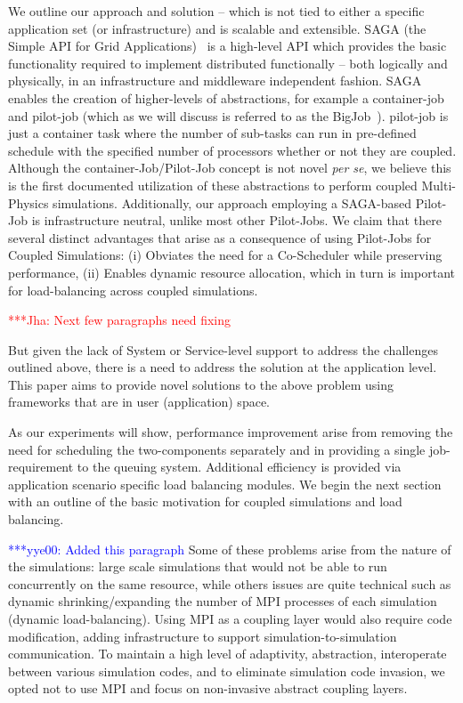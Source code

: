 \documentclass[conference,final]{IEEEtran}
\newcommand{\jhanote}[1]{ {\textcolor{red} { ***Jha: #1 }}}
\newcommand{\yyenote}[1]{ {\textcolor{blue} { ***yye00: #1 }}}
\newcommand{\jhanote}[1]{}
\begin{document}
We outline our approach and solution -- which is not tied to either a
specific application set (or infrastructure) and is scalable and
extensible. SAGA (the Simple API for Grid
Applications)~\cite{saga_web} is a high-level API which provides the
basic functionality required to implement distributed functionally --
both logically and physically, in an infrastructure and middleware
independent fashion. SAGA enables the creation of higher-levels of
abstractions, for example a container-job and pilot-job (which as we
will discuss is referred to as the BigJob~\cite{saga_royalsoc}). %
pilot-job is just a container task where the number of sub-tasks can
run in pre-defined schedule with the specified number of processors
whether or not they are coupled. Although the container-Job/Pilot-Job
concept is not novel {\it per se}, we believe this is the first
documented utilization of these abstractions to perform coupled
Multi-Physics simulations. Additionally, our approach employing a
SAGA-based Pilot-Job is infrastructure neutral, unlike most other
Pilot-Jobs. We claim that there several distinct advantages that arise
as a consequence of using Pilot-Jobs for Coupled Simulations: (i)
Obviates the need for a Co-Scheduler while preserving performance,
(ii) Enables dynamic resource allocation, which in turn is important
for load-balancing across coupled simulations.

\jhanote{Next few paragraphs need fixing}

But given the lack of System or Service-level support to address the
challenges outlined above, there is a need to address the solution at
the application level. This paper aims to provide novel solutions to
the above problem using frameworks that are in user (application)
space.

As our experiments will show, performance improvement arise from
removing the need for scheduling the two-components separately and in
providing a single job-requirement to the queuing system. Additional
efficiency is provided via application scenario specific load
balancing modules. We begin the next section with an outline of the
basic motivation for coupled simulations and load balancing.

\yyenote{Added this paragraph} Some of these problems arise from the
nature of the simulations: large scale simulations that would not be
able to run concurrently on the same resource, while others issues are
quite technical such as dynamic shrinking/expanding the number of MPI
processes of each simulation (dynamic load-balancing). Using MPI as a
coupling layer would also require code modification, adding
infrastructure to support simulation-to-simulation communication. To
maintain a high level of adaptivity, abstraction, interoperate between
various simulation codes, and to eliminate simulation code invasion,
we opted not to use MPI and focus on non-invasive abstract coupling
layers.
\end{document}
